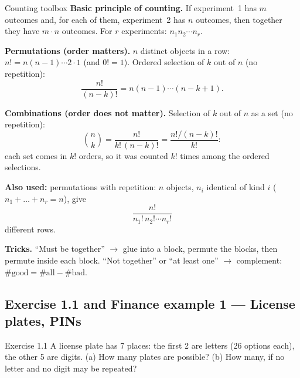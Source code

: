 \begin{key}{Counting toolbox}
	\textbf{Basic principle of counting.} If experiment~1 has $m$ outcomes and,
	for each of them, experiment~2 has $n$ outcomes, then together they have
	$m\cdot n$ outcomes. For $r$ experiments: $n_1n_2\cdots n_r$.

	\textbf{Permutations (order matters).} $n$ distinct objects in a row:
	$n! = n(n-1)\cdots 2\cdot1$ (and $0!=1$). Ordered selection of $k$ out of
	$n$ (no repetition):
	\[ \frac{n!}{(n-k)!}=n(n-1)\cdots(n-k+1). \]

	\textbf{Combinations (order does not matter).} Selection of $k$ out of $n$
	as a set (no repetition):
	\[ \binom nk=\frac{n!}{k!\,(n-k)!}=\frac{n!/(n-k)!}{k!}: \]
	each set comes in $k!$ orders, so it was counted $k!$ times among the
	ordered selections.

	\textbf{Also used:} permutations with repetition:
	$n$ objects, $n_i$ identical of kind $i$ ($n_1+\dots+n_r=n$), give
	\[ \frac{n!}{n_1!\,n_2!\cdots n_r!} \]
	different rows.


	\textbf{Tricks.} ``Must be together'' $\to$ glue into a block, permute the
	blocks, then permute inside each block. ``Not together'' or ``at least
	one'' $\to$ complement: $\#\text{good}=\#\text{all}-\#\text{bad}$.
\end{key}

\subsection{Exercise 1.1 and Finance example 1 --- License plates, PINs}

\begin{task}{Exercise 1.1}
	A license plate has 7 places: the first 2 are letters (26 options each), the
	other 5 are digits. (a) How many plates are possible? (b) How many, if no
	letter and no digit may be repeated?
\end{task}
\workspace{3cm}

